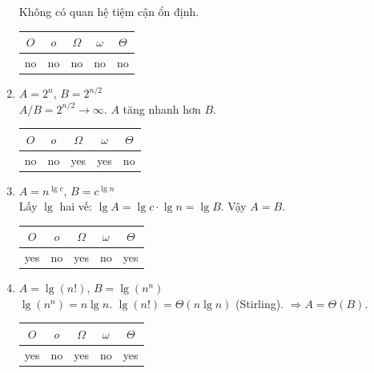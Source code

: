 \documentclass[12pt,a4paper]{article}
\begin{document}
\begin{enumerate}[label=\textbf{\alph*.}]
  Không có quan hệ tiệm cận ổn định.

  \begin{center}
  \begin{tabular}{|c|c|c|c|c|}
  \hline $O$ & $o$ & $\Omega$ & $\omega$ & $\Theta$ \\ \hline
  no & no & no & no & no \\ \hline
  \end{tabular}
  \end{center}

  \item $A = 2^n$, $B = 2^{n/2}$ \\[4pt]
  $A/B = 2^{n/2} \to \infty$. $A$ tăng nhanh hơn $B$.

  \begin{center}
  \begin{tabular}{|c|c|c|c|c|}
  \hline $O$ & $o$ & $\Omega$ & $\omega$ & $\Theta$ \\ \hline
  no & no & yes & yes & no \\ \hline
  \end{tabular}
  \end{center}

  \item $A = n^{\lg c}$, $B = c^{\lg n}$ \\[4pt]
  Lấy $\lg$ hai vế: $\lg A = \lg c \cdot \lg n = \lg B$. Vậy $A = B$.

  \begin{center}
  \begin{tabular}{|c|c|c|c|c|}
  \hline $O$ & $o$ & $\Omega$ & $\omega$ & $\Theta$ \\ \hline
  yes & no & yes & no & yes \\ \hline
  \end{tabular}
  \end{center}

  \item $A = \lg(n!)$, $B = \lg(n^n)$ \\[4pt]
  $\lg(n^n) = n\lg n$. $\lg(n!) = \Theta(n\lg n)$ (Stirling). $\Longrightarrow A = \Theta(B)$.

  \begin{center}
  \begin{tabular}{|c|c|c|c|c|}
  \hline $O$ & $o$ & $\Omega$ & $\omega$ & $\Theta$ \\ \hline
  yes & no & yes & no & yes \\ \hline
  \end{tabular}
  \end{center}

\end{enumerate}
\end{document}
